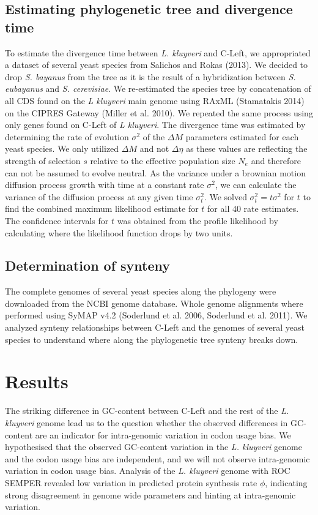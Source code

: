 \documentclass[letter,12pt]{article}
\begin{document}
\subsection{Estimating phylogenetic tree and divergence time}
To estimate the divergence time between \textit{L. kluyveri} and C-Left, we appropriated a dataset of several yeast species from Salichos and Rokas (2013). 
We decided to drop \textit{S. bayanus} from the tree as it is the result of a hybridization between \textit{S. eubayanus} and \textit{S. cerevisiae}.
We re-estimated the species tree by concatenation of all CDS found on the \textit{L kluyveri} main genome using RAxML (Stamatakis 2014) on the CIPRES Gateway (Miller et al. 2010).
We repeated the same process using only genes found on C-Left of \textit{L kluyveri}.
The divergence time was estimated by determining the rate of evolution $\sigma^2$ of the $\Delta M$ parameters estimated for each yeast species.
We only utilized $\Delta M$ and not $\Delta \eta$ as these values are reflecting the strength of selection $s$ relative to the effective population size $N_e$ and therefore can not be assumed to evolve neutral.
As the variance under a brownian motion diffusion process growth with time at a constant rate $\sigma^2$, we can calculate the variance of the diffusion process at any given time $\sigma^2_t$. 
We solved $\sigma^2_t = t\sigma^2$ for $t$ to find the combined maximum likelihood estimate for $t$ for all 40 rate estimates.
The confidence intervals for $t$ was obtained from the profile likelihood by calculating where the likelihood function drops by two units.
  
\subsection{Determination of synteny}	
The complete genomes of several yeast species along the phylogeny were downloaded from the NCBI genome database.
Whole genome alignments where performed using SyMAP v4.2 (Soderlund et al. 2006, Soderlund et al. 2011).
We analyzed synteny relationships between C-Left and the genomes of several yeast species to understand where along the phylogenetic tree synteny breaks down.
  
	
\section*{Results}
The striking difference in GC-content between C-Left and the rest of the \textit{L. kluyveri} genome lead us to the question whether the observed differences in GC-content are an indicator for intra-genomic variation in codon usage bias.
We hypothesised that the observed GC-content variation in the \textit{L. kluyveri} genome and the codon usage bias are independent, and we will not observe intra-genomic variation in codon usage bias.
Analysis of the \textit{L. kluyveri} genome with ROC SEMPER revealed low variation in predicted protein synthesis rate $\phi$, indicating strong disagreement in genome wide parameters and hinting at intra-genomic variation.
  
\end{document}
